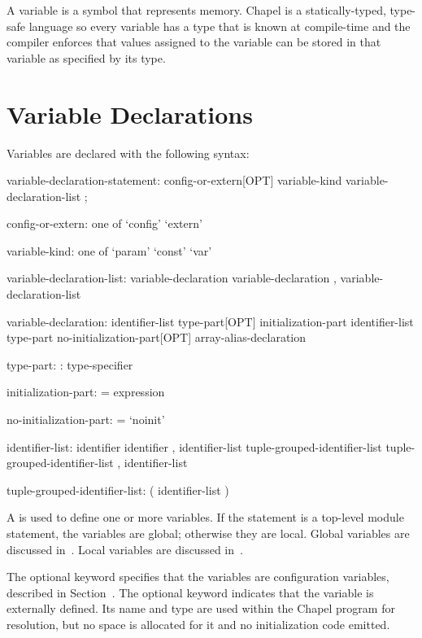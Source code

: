 \label{Variables}

A variable is a symbol that represents memory.  Chapel is a
statically-typed, type-safe language so every variable has a type that
is known at compile-time and the compiler enforces that values
assigned to the variable can be stored in that variable as specified
by its type.

\section{Variable Declarations}
\label{Variable_Declarations}

Variables are declared with the following syntax:
\begin{syntax}
variable-declaration-statement:
  config-or-extern[OPT] variable-kind variable-declaration-list ;

config-or-extern: one of
  `config' `extern'

variable-kind: one of
  `param' `const' `var'

variable-declaration-list:
  variable-declaration
  variable-declaration , variable-declaration-list

variable-declaration:
  identifier-list type-part[OPT] initialization-part
  identifier-list type-part no-initialization-part[OPT]
  array-alias-declaration

type-part:
  : type-specifier

initialization-part:
  = expression

no-initialization-part:
  = `noinit'

identifier-list:
  identifier
  identifier , identifier-list
  tuple-grouped-identifier-list
  tuple-grouped-identifier-list , identifier-list

tuple-grouped-identifier-list:
  ( identifier-list )
\end{syntax}
A  is used to define one or more
variables.  If the statement is a top-level module statement, the
variables are global; otherwise they are local.  Global variables are
discussed in~.  Local variables are discussed
in~.

The optional keyword  specifies that the variables are
configuration variables, described in
Section~.  The optional keyword 
indicates that the variable is externally defined.  Its name and type are used
within the Chapel program for resolution, but no space is allocated for it and
no initialization code emitted.

